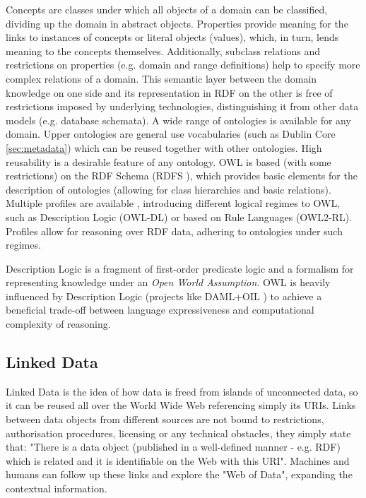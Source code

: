 \documentclass[a4paper,english,twoside,BCOR1.5cm,headsepline,DIV12,appendixprefix,final,12pt]{scrbook}
\begin{document}
Concepts are classes under which all objects of a domain can be classified, dividing up the domain in abstract objects. Properties provide meaning for the links to instances of concepts or literal objects (values), which, in turn, lends meaning to the concepts themselves. Additionally, subclass relations and restrictions on properties (e.g. domain and range definitions) help to specify more complex relations of a domain. This semantic layer between the domain knowledge on one side and its representation in RDF on the other is free of restrictions imposed by underlying technologies, distinguishing it from other data models (e.g. database schemata). A wide range of ontologies is available for any domain. Upper ontologies are general use vocabularies (such as Dublin Core \cref{sec:metadata}) which can be reused together with other ontologies. High reusability is a desirable feature of any ontology.
OWL is based (with some restrictions) on the RDF Schema (RDFS \cite{RDFS11}), which provides basic elements for the description of ontologies (allowing for class hierarchies and basic relations).
Multiple profiles are available \cite{OWLPROFILES}, introducing different logical regimes to OWL, such as Description Logic (OWL-DL) or based on Rule Languages (OWL2-RL). Profiles allow for reasoning over RDF data, adhering to ontologies under such regimes. 

Description Logic is a fragment of first-order predicate logic \cite{Barwise1977} and a formalism for representing knowledge under an \textit{Open World Assumption}. OWL is heavily influenced by Description Logic (projects like DAML+OIL \cite{HPMW07}) to achieve a beneficial trade-off between language expressiveness and computational complexity of reasoning.


\subsection{Linked Data}
\label{sec:ld}
Linked Data is the idea of how data is freed from islands of unconnected data, so it can be reused all over the World Wide Web referencing simply its URIs. Links between data objects from different sources are not bound to restrictions, authorisation procedures, licensing or any technical obstacles, they simply state that: "There is a data object (published in a well-defined manner - e.g. RDF) which is related and it is identifiable on the Web with this URI". Machines and humans can follow up these links and explore the "Web of Data", expanding the contextual information.
\end{document}
